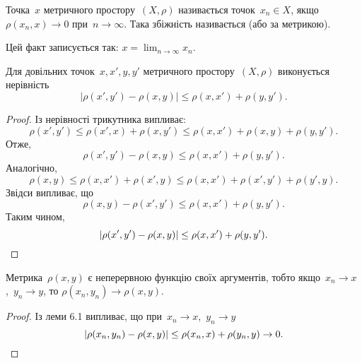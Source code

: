 \begin{definition}
Точка~$x$ метричного простору~$(X, \rho)$
називається  точок~$x_n \in X$, якщо
$\rho(x_n, x) \to 0$  при~$n \to \infty$. Така збіжність називається
 (або за метрикою).

Цей факт записується так: $x = \lim_{n \to \infty} x_n$.
\end{definition}

\begin{lemma}
Для довільних точок~$x, x', y, y'$ метричного
простору~$(X, \rho)$ виконується нерівність
\begin{equation*}
    |\rho(x', y') - \rho(x, y)| \le \rho(x, x') + \rho(y, y').
\end{equation*}
\end{lemma}

\begin{proof}
Із нерівності трикутника випливає:
\begin{equation*}
    \rho(x', y') \le
    \rho(x', x) + \rho(x, y') \le
    \rho(x, x') + \rho(x, y) + \rho(y, y').
\end{equation*}
Отже,
\begin{equation*}
    \rho(x', y') - \rho(x, y) \le
    \rho(x, x') + \rho(y, y').
\end{equation*}
Аналогічно,
\begin{equation*}
    \rho(x, y) \le
    \rho(x, x') + \rho(x', y) \le
    \rho(x, x') + \rho(x', y') + \rho( y', y).
\end{equation*}
Звідси випливає, що
\begin{equation*}
    \rho(x, y) - \rho(x', y') \le
    \rho(x, x') + \rho(y, y').
\end{equation*}
Таким чином,
\begin{equation*}
    |\rho(x', y') - \rho(x, y)| \le
    \rho(x, x') + \rho(y, y'). \qedhere
\end{equation*}
\end{proof}

\begin{lemma}
Метрика~$\rho(x, y)$ є неперервною функцію своїх
аргументів, тобто якщо~$x_n \to x$,~$y_n \to y$, то
$\rho(x_n, y_n) \to \rho(x, y)$.
\end{lemma}

\begin{proof}
Із леми 6.1 випливає, що при~$x_n \to x$,~$y_n \to y$
\begin{equation*}
    |\rho(x_n, y_n) - \rho(x, y)| \le
    \rho(x_n, x) + \rho(y_n, y) \to
    0. \qedhere
\end{equation*}
\end{proof}

